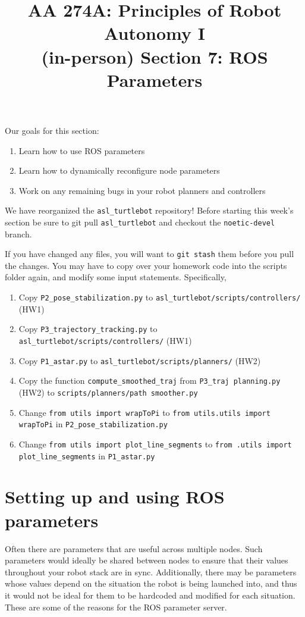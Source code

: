 \documentclass{article}
\title{AA 274A: Principles of Robot Autonomy I \\ (in-person) Section 7: ROS Parameters}
\date{}
\begin{document}
\maketitle
\pagestyle{fancy}

Our goals for this section: \begin{enumerate}
	\item Learn how to use ROS parameters
    \item Learn how to dynamically reconfigure node parameters
    \item Work on any remaining bugs in your robot planners and controllers
\end{enumerate}
We have reorganized the \texttt{asl\_turtlebot} repository! Before starting this week's section be sure to git pull \texttt{asl\_turtlebot} and checkout the \texttt{noetic-devel} branch. 

If you have changed any files, you will want to \texttt{git stash} them before you pull the changes. You may have to copy over your homework code into the scripts folder again, and modify some input statements. Specifically,
\begin{enumerate}
    \item Copy \texttt{P2\_pose\_stabilization.py} to \texttt{asl\_turtlebot/scripts/controllers/} (HW1)
    \item Copy \texttt{P3\_trajectory\_tracking.py} to \texttt{asl\_turtlebot/scripts/controllers/} (HW1)
    \item Copy \texttt{P1\_astar.py} to \texttt{asl\_turtlebot/scripts/planners/} (HW2)
    \item Copy the function \texttt{compute\_smoothed\_traj} from \texttt{P3\_traj planning.py} (HW2) to \texttt{scripts/planners/path smoother.py}
    \item Change \texttt{from utils import wrapToPi} to \texttt{from utils.utils import wrapToPi} in \texttt{P2\_pose\_stabilization.py}
    \item Change \texttt{from utils import plot\_line\_segments} to \texttt{from .utils import plot\_line\_segments} in \texttt{P1\_astar.py}
\end{enumerate}

\section{Setting up and using ROS parameters}
Often there are parameters that are useful across multiple nodes. Such parameters would ideally be shared between nodes to ensure that their values throughout your robot stack are in sync. Additionally, there may be parameters whose values depend on the situation the robot is being launched into, and thus it would not be ideal for them to be hardcoded and modified for each situation. These are some of the reasons for the ROS parameter server.
\end{document}
